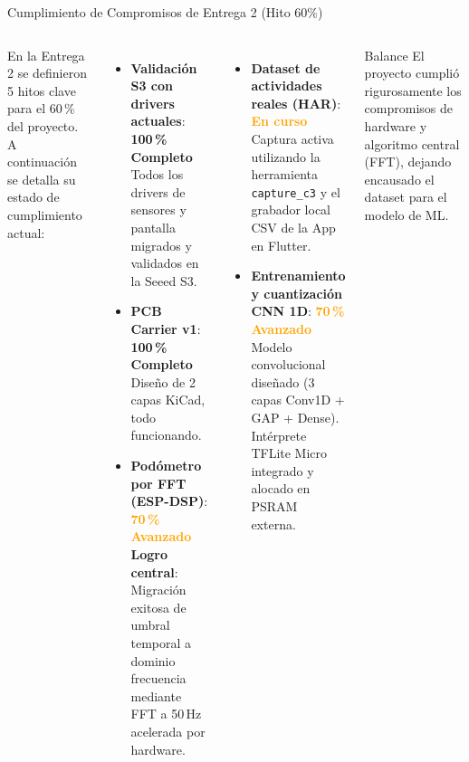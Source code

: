 \documentclass[aspectratio=169, 10pt]{beamer}
\begin{document}
\begin{frame}{Cumplimiento de Compromisos de Entrega 2 (Hito 60\%)}
    \begin{columns}[T]
        \footnotesize
        En la Entrega 2 se definieron 5 hitos clave para el 60\,\% del proyecto. A continuación se detalla su estado de cumplimiento actual:
        \vspace{0.2cm}
        \begin{itemize}\itemsep0.15cm
            \item \textbf{Validaci\'on S3 con drivers actuales}: \textcolor{accent}{\textbf{100\,\% Completo}} \\
            Todos los drivers de sensores y pantalla migrados y validados en la Seeed S3.
            \item \textbf{PCB Carrier v1}: \textcolor{accent}{\textbf{100\,\% Completo}} \\
            Diseño de 2 capas KiCad, todo funcionando.
            \item \textbf{Pod\'ometro por FFT (ESP-DSP)}: \textcolor{orange}{\textbf{70\,\% Avanzado}} \\
            \alert{\textbf{Logro central}}: Migración exitosa de umbral temporal a dominio frecuencia mediante FFT a 50\,Hz acelerada por hardware.
        \end{itemize}
        \footnotesize
        \begin{itemize}\itemsep0.15cm
            \item \textbf{Dataset de actividades reales (HAR)}: \textcolor{orange}{\textbf{En curso}} \\
            Captura activa utilizando la herramienta \texttt{capture\_c3} y el grabador local CSV de la App en Flutter.
            \item \textbf{Entrenamiento y cuantizaci\'on CNN 1D}: \textcolor{orange}{\textbf{70\,\% Avanzado}} \\
            Modelo convolucional diseñado (3 capas Conv1D + GAP + Dense). Intérprete TFLite Micro integrado y alocado en PSRAM externa.
        \end{itemize}
        \vspace{0.4cm}
        \begin{block}{Balance}
            \scriptsize El proyecto cumpli\'o rigurosamente los compromisos de hardware y algoritmo central (FFT), dejando encausado el dataset para el modelo de ML.
        \end{block}
    \end{columns}
\end{frame}
\end{document}
